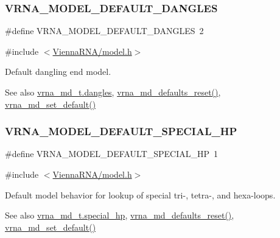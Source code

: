 \subsubsection{\texorpdfstring{VRNA\_MODEL\_DEFAULT\_DANGLES}{VRNA\_MODEL\_DEFAULT\_DANGLES}}
{\footnotesize\ttfamily \#define V\+R\+N\+A\+\_\+\+M\+O\+D\+E\+L\+\_\+\+D\+E\+F\+A\+U\+L\+T\+\_\+\+D\+A\+N\+G\+L\+ES~2}



{\ttfamily \#include $<$\mbox{\hyperlink{model_8h}{Vienna\+R\+N\+A/model.\+h}}$>$}



Default dangling end model. 

\begin{DoxySeeAlso}{See also}
\mbox{\hyperlink{group__model__details_adcda4ff2ea77748ae0e8700288282efc}{vrna\+\_\+md\+\_\+t.\+dangles}}, \mbox{\hyperlink{group__model__details_ga70834424cf804d149937de89f80ceb45}{vrna\+\_\+md\+\_\+defaults\+\_\+reset()}}, \mbox{\hyperlink{group__model__details_ga8ac6ff84936282436f822644bf841f66}{vrna\+\_\+md\+\_\+set\+\_\+default()}} 
\end{DoxySeeAlso}
\mbox{\label{group__model__details_gabd1ab224e1048defd45c165ed7d1c108}} 
\subsubsection{\texorpdfstring{VRNA\_MODEL\_DEFAULT\_SPECIAL\_HP}{VRNA\_MODEL\_DEFAULT\_SPECIAL\_HP}}
{\footnotesize\ttfamily \#define V\+R\+N\+A\+\_\+\+M\+O\+D\+E\+L\+\_\+\+D\+E\+F\+A\+U\+L\+T\+\_\+\+S\+P\+E\+C\+I\+A\+L\+\_\+\+HP~1}



{\ttfamily \#include $<$\mbox{\hyperlink{model_8h}{Vienna\+R\+N\+A/model.\+h}}$>$}



Default model behavior for lookup of special tri-\/, tetra-\/, and hexa-\/loops. 

\begin{DoxySeeAlso}{See also}
\mbox{\hyperlink{group__model__details_add64a96d23e77ef1d0ddf8dfc5228143}{vrna\+\_\+md\+\_\+t.\+special\+\_\+hp}}, \mbox{\hyperlink{group__model__details_ga70834424cf804d149937de89f80ceb45}{vrna\+\_\+md\+\_\+defaults\+\_\+reset()}}, \mbox{\hyperlink{group__model__details_ga8ac6ff84936282436f822644bf841f66}{vrna\+\_\+md\+\_\+set\+\_\+default()}} 
\end{DoxySeeAlso}
\mbox{\label{group__model__details_gab72462726dd60ed0d43339bbf7ee08ad}} 
